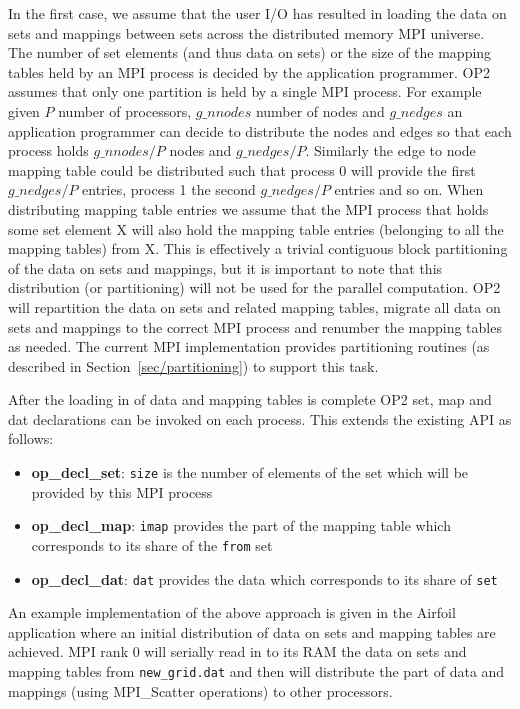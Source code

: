 \documentclass[11pt]{article}
\begin{document}
In the first case, we assume that the user I/O has resulted in loading the data on sets and mappings between
sets across the distributed memory MPI universe. The number of set elements (and thus data on sets) or the size of the
mapping tables held by an MPI process is decided by the application programmer. OP2 assumes that only one partition
is held by a single MPI process. For example given $P$ number of processors, $g\_nnodes$ number of nodes and $g\_nedges$
an application programmer can decide to distribute the nodes and edges so that each process holds $g\_nnodes/P$ nodes
and $g\_nedges/P$. Similarly the edge to node mapping table could be distributed such that process 0 will provide the
first $g\_nedges/P$ entries, process 1 the second $g\_nedges/P$ entries and so on. When distributing mapping table
entries we assume that the MPI process that holds some set element X will also hold the mapping table entries (belonging
to all the mapping tables) from X. This is effectively a trivial contiguous block partitioning of the data on sets and
mappings, but it is important to note that this distribution (or partitioning) will not be used for the parallel
computation. OP2 will repartition the data on sets and related mapping tables, migrate all data on sets and mappings to
the correct MPI process and renumber the mapping tables as needed. The current MPI implementation provides partitioning
routines (as described in Section~\ref{sec/partitioning}) to support this task.

\indent After the loading in of data and mapping tables is complete OP2 set, map and dat declarations can be invoked on
each process. This extends the existing API as follows:
\begin{itemize}
\item {\bf op\_decl\_set}: {\tt size} is the number of elements of the set which
will be provided by this MPI process

\item {\bf op\_decl\_map}: {\tt imap} provides the part of the mapping table
which corresponds to its share of the {\tt from} set

\item {\bf op\_decl\_dat}: {\tt dat} provides the data which corresponds to its
share of {\tt set}
\end{itemize}
\noindent An example implementation of the above approach is given in the Airfoil application where an initial
distribution of data on sets and mapping tables are achieved. MPI rank 0 will serially read in to its RAM the data on
sets and mapping tables from \texttt{new\_grid.dat} and then will distribute the part of data and mappings (using
MPI\_Scatter operations) to other processors.\\
\end{document}
